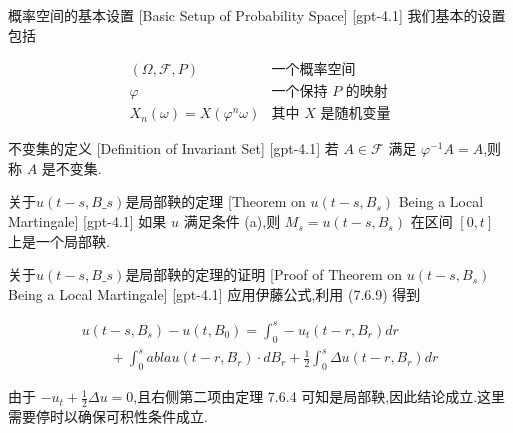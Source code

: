 \documentclass[UTF8]{ctexart}
\begin{document}
    
    
    \begin{dfn}
        {概率空间的基本设置}
        [Basic Setup of Probability Space]
        [gpt-4.1]
        我们基本的设置包括

\[
\begin{array}{rl}
(\Omega, \mathcal{F}, P) & \text{一个概率空间} \\
\varphi & \text{一个保持 } P \text{ 的映射} \\
X_{n}(\omega) = X(\varphi^{n} \omega) & \text{其中 } X \text{ 是随机变量}
\end{array}
\]

    \end{dfn}
    
    
    
    \begin{dfn}
        {不变集的定义}
        [Definition of Invariant Set]
        [gpt-4.1]
        若 $A \in \mathcal{F}$ 满足 $\varphi^{-1}A = A$,则称 $A$ 是不变集.
    \end{dfn}
    
    
    
    \begin{thm}
        {关于$u(t - s, B\_s)$是局部鞅的定理}
        [Theorem on $u(t - s, B_s)$ Being a Local Martingale]
        [gpt-4.1]
        如果 $u$ 满足条件 (a),则 $M_s = u(t - s, B_s)$ 在区间 $[0, t]$ 上是一个局部鞅.
    \end{thm}
    
    
    
    \begin{prf}
        {关于$u(t - s, B\_s)$是局部鞅的定理的证明}
        [Proof of Theorem on $u(t - s, B_s)$ Being a Local Martingale]
        [gpt-4.1]
        应用伊藤公式,利用 (7.6.9) 得到

\[
\begin{array}{l}
\displaystyle u(t - s, B_s) - u(t, B_0) = \int_{0}^{s} -u_t(t - r, B_r) dr \\
\displaystyle \qquad + \int_{0}^{s} 
abla u(t - r, B_r) \cdot dB_r + \frac{1}{2} \int_{0}^{s} \Delta u(t - r, B_r) dr
\end{array}
\]

由于 $-u_t + \frac{1}{2} \Delta u = 0$,且右侧第二项由定理 7.6.4 可知是局部鞅,因此结论成立.这里需要停时以确保可积性条件成立.
    \end{prf}
    
\end{document}
